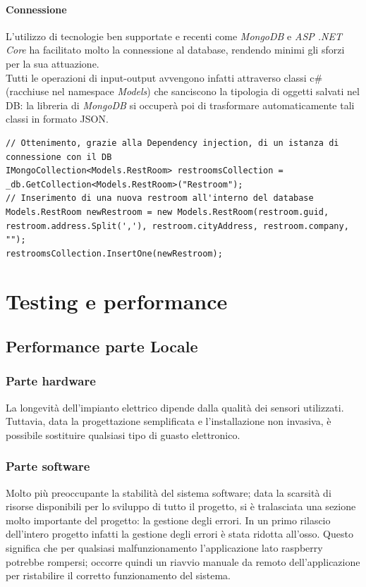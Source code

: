 \documentclass[12pt]{article}
\begin{document}
\paragraph{Connessione}
L'utilizzo di tecnologie ben supportate e recenti come \textit{MongoDB} e \textit{ASP .NET Core} ha facilitato molto la connessione al database, rendendo minimi gli sforzi per la sua attuazione.\\
Tutti le operazioni di input-output avvengono infatti attraverso classi c\# (racchiuse nel namespace \textit{Models}) che sanciscono la tipologia di oggetti salvati nel DB: la libreria di \textit{MongoDB} si occuperà poi di trasformare automaticamente tali classi in formato JSON.

\begin{lstlisting}
// Ottenimento, grazie alla Dependency injection, di un istanza di connessione con il DB
IMongoCollection<Models.RestRoom> restroomsCollection = _db.GetCollection<Models.RestRoom>("Restroom");
// Inserimento di una nuova restroom all'interno del database
Models.RestRoom newRestroom = new Models.RestRoom(restroom.guid, restroom.address.Split(','), restroom.cityAddress, restroom.company, "");
restroomsCollection.InsertOne(newRestroom);

\end{lstlisting}
\newpage

\section{Testing e performance}
\subsection{Performance parte Locale}
\subsubsection{Parte hardware}
La longevità dell'impianto elettrico dipende dalla qualità dei sensori utilizzati. Tuttavia, data la progettazione semplificata e l'installazione non invasiva, è possibile sostituire qualsiasi tipo di guasto elettronico.
\subsubsection{Parte software}
Molto più preoccupante la stabilità del sistema software; data la scarsità di risorse disponibili per lo sviluppo di tutto il progetto, si è tralasciata una sezione molto importante del progetto: la gestione degli errori. In un primo rilascio dell'intero progetto infatti la gestione degli errori è stata ridotta all'osso. Questo significa che per qualsiasi malfunzionamento l'applicazione lato raspberry potrebbe rompersi; occorre quindi un riavvio manuale da remoto dell'applicazione per ristabilire il corretto funzionamento del sistema.
\newpage
\end{document}
